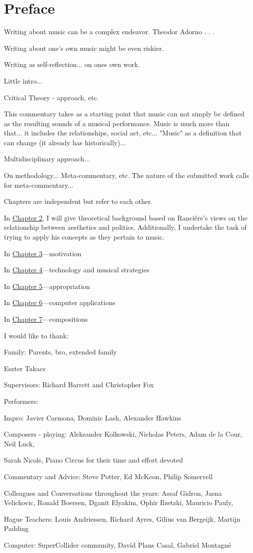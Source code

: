 \chapter{Preface}


Writing about music can be a complex endeavor. Theodor Adorno . . .

Writing about one's own music might be even riskier.

Writing as self-reflection... on ones own work.

Little intro... 

Critical Theory - approach, etc.

This commentary takes as a starting point that music can not simply be defined as the resulting sounds of a musical performance. Music is much more than that... it includes the relationships, social act, etc... "Music" as a definition that can change (it already has historically)...

Multidisciplinary approach...

On methodology... Meta-commentary, etc. The nature of the submitted work calls for meta-commentary...

Chapters are independent but refer to each other.

In \hyperlink{chapter2}{Chapter 2}, I will give theoretical background based on Ranci\`{e}re's views on the relationship between aesthetics and politics. Additionally, I undertake the task of trying to apply his concepts as they pertain to music. 

In \hyperlink{chapter3}{Chapter 3}---motivation

In \hyperlink{chapter4}{Chapter 4}---technology and musical strategies 

In \hyperlink{chapter5}{Chapter 5}---appropriation

In \hyperlink{chapter6}{Chapter 6}---computer applications

In \hyperlink{chapter7}{Chapter 7}---compositions

I would like to thank:

Family: Parents, bro, extended family 

Eszter Takacs

Supervisors: Richard Barrett and Christopher Fox

Performers: 

Impro: Javier Carmona, Dominic Lash, Alexander Hawkins

Composers - playing: Aleksander Kolkowski, Nicholas Peters, Adam de la Cour, Neil Luck, 

Sarah Nicols, Piano Circus for their time and effort devoted

Commentary and Advice: Steve Potter, Ed McKeon, Philip Somervell

Colleagues and Conversations throughout the years:  Assaf Gidron, Jasna Velickovic, Ronald Boersen, Dganit Elyakim, Ophir Ilzetzki, Mauricio Pauly, 

Hague Teachers: Louis Andriessen, Richard Ayres, Gilius van Bergeijk, Martijn Padding

Computer: SuperCollider community, David Plans Casal, Gabriel Montagn\'e

\label{ch:preface}